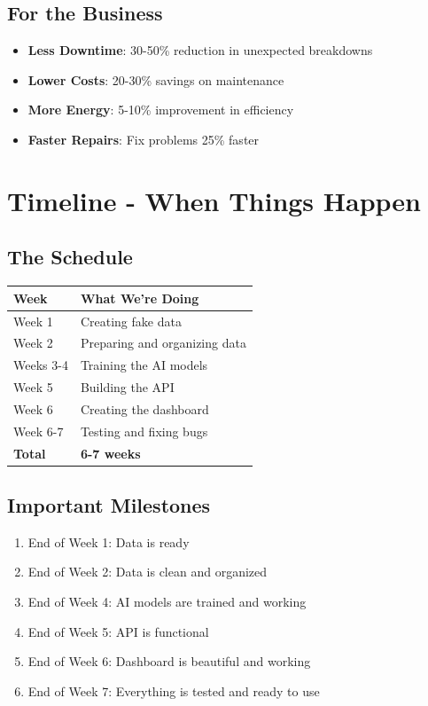 \documentclass[12pt,a4paper]{article}
\begin{document}
\subsection{For the Business}

\begin{itemize}[leftmargin=*]
    \item \textbf{Less Downtime}: 30-50\% reduction in unexpected breakdowns
    \item \textbf{Lower Costs}: 20-30\% savings on maintenance
    \item \textbf{More Energy}: 5-10\% improvement in efficiency
    \item \textbf{Faster Repairs}: Fix problems 25\% faster
\end{itemize}

\newpage

\section{Timeline - When Things Happen}

\subsection{The Schedule}

\begin{center}
\begin{tabular}{|l|l|}
\hline
\textbf{Week} & \textbf{What We're Doing} \\
\hline
Week 1 & Creating fake data \\
\hline
Week 2 & Preparing and organizing data \\
\hline
Weeks 3-4 & Training the AI models \\
\hline
Week 5 & Building the API \\
\hline
Week 6 & Creating the dashboard \\
\hline
Week 6-7 & Testing and fixing bugs \\
\hline
\textbf{Total} & \textbf{6-7 weeks} \\
\hline
\end{tabular}
\end{center}

\subsection{Important Milestones}

\begin{enumerate}[leftmargin=*]
    \item End of Week 1: Data is ready
    \item End of Week 2: Data is clean and organized
    \item End of Week 4: AI models are trained and working
    \item End of Week 5: API is functional
    \item End of Week 6: Dashboard is beautiful and working
    \item End of Week 7: Everything is tested and ready to use
\end{enumerate}
\end{document}
